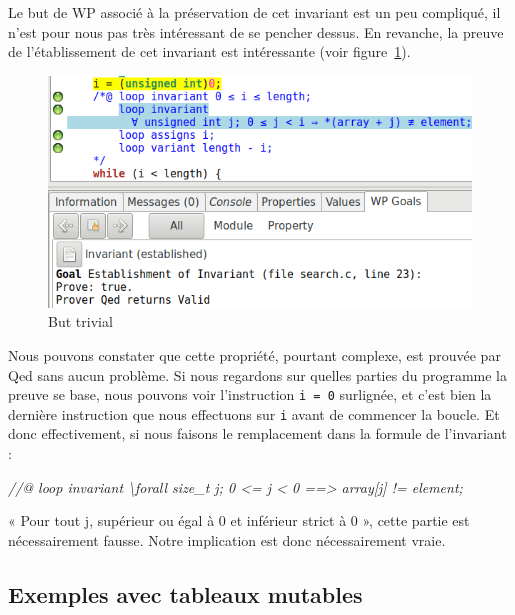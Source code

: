 \documentclass[12pt,francais,]{scrbook}
\newenvironment{Shaded}{}{}
\newcommand{\CommentTok}[1]{\textcolor[rgb]{0.38,0.63,0.69}{\textit{{#1}}}}
\begin{document}
Le but de WP associé à la préservation de cet invariant est un peu
compliqué, il n'est pour nous pas très intéressant de se pencher dessus.
En revanche, la preuve de l'établissement de cet invariant est
intéressante (voir figure~\ref{fig:3-4-trivial}).

\begin{figure}[htbp]
\centering
\includegraphics[scale=0.5]{3-4-trivial-establishment.png}
\caption{But trivial}
\label{fig:3-4-trivial}
\end{figure}

Nous pouvons constater que cette propriété, pourtant complexe, est
prouvée par Qed sans aucun problème. Si nous regardons sur quelles
parties du programme la preuve se base, nous pouvons voir l'instruction
\texttt{i\ =\ 0} surlignée, et c'est bien la dernière instruction que
nous effectuons sur \texttt{i} avant de commencer la boucle. Et donc
effectivement, si nous faisons le remplacement dans la formule de
l'invariant :

\begin{footnotesize}\begin{Shaded}
\begin{Highlighting}[]
\CommentTok{//@ loop invariant \textbackslash{}forall size_t j; 0 <= j < 0 ==> array[j] != element;}
\end{Highlighting}
\end{Shaded}\end{footnotesize}

« Pour tout j, supérieur ou égal à 0 et inférieur strict à 0 », cette
partie est nécessairement fausse. Notre implication est donc
nécessairement vraie.

\subsection{Exemples avec tableaux
mutables}\label{exemples-avec-tableaux-mutables}
\end{document}
